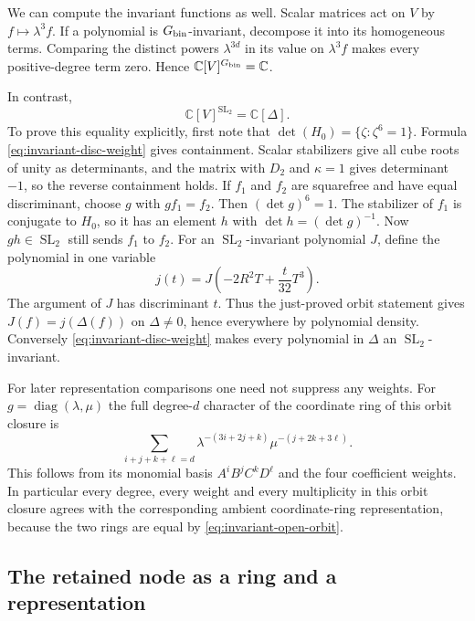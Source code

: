 We can compute the invariant functions as well. Scalar matrices act
on $V$ by $f\mapsto\lambda^3f$. If a polynomial is $G_{\rm bin}$-invariant,
decompose it into its homogeneous terms. Comparing the distinct powers
$\lambda^{3d}$ in its value on $\lambda^3f$ makes every positive-degree
term zero. Hence $\mathbb C[V]^{G_{\rm bin}}=\mathbb C$.

In contrast,
\begin{equation}\label{eq:invariant-SL2}
 \mathbb C[V]^{\operatorname{SL}_2}=\mathbb C[\Delta].
\end{equation}
To prove this equality explicitly, first note that
$\det(H_0)=\{\zeta:\zeta^6=1\}$. Formula
\eqref{eq:invariant-disc-weight} gives containment. Scalar stabilizers
give all cube roots of unity as determinants, and the matrix with
$D_2$ and $\kappa=1$ gives determinant $-1$, so the reverse containment
holds. If $f_1$ and $f_2$ are squarefree and have equal discriminant,
choose $g$ with $g f_1=f_2$. Then $(\det g)^6=1$. The stabilizer of
$f_1$ is conjugate to $H_0$, so it has an element $h$ with
$\det h=(\det g)^{-1}$. Now $gh\in\operatorname{SL}_2$ still sends
$f_1$ to $f_2$. For an $\operatorname{SL}_2$-invariant polynomial $J$,
define the polynomial in one variable
\[
 j(t)=J\left(-2R^2T+\frac{t}{32}T^3\right).
\]
The argument of $J$ has discriminant $t$. Thus the just-proved orbit
statement gives $J(f)=j(\Delta(f))$ on $\Delta\ne0$, hence everywhere
by polynomial density. Conversely \eqref{eq:invariant-disc-weight}
makes every polynomial in $\Delta$ an $\operatorname{SL}_2$-invariant.

For later representation comparisons one need not suppress any weights.
For $g=\operatorname{diag}(\lambda,\mu)$ the full degree-$d$ character
of the coordinate ring of this orbit closure is
\begin{equation}\label{eq:invariant-cubic-character}
 \sum_{i+j+k+\ell=d}
 \lambda^{-(3i+2j+k)}\mu^{-(j+2k+3\ell)}.
\end{equation}
This follows from its monomial basis $A^iB^jC^kD^\ell$ and the four
coefficient weights. In particular every degree, every weight and
every multiplicity in this orbit closure agrees with the corresponding
ambient coordinate-ring representation, because the two rings are
equal by \eqref{eq:invariant-open-orbit}.

\subsection{The retained node as a ring and a representation}

